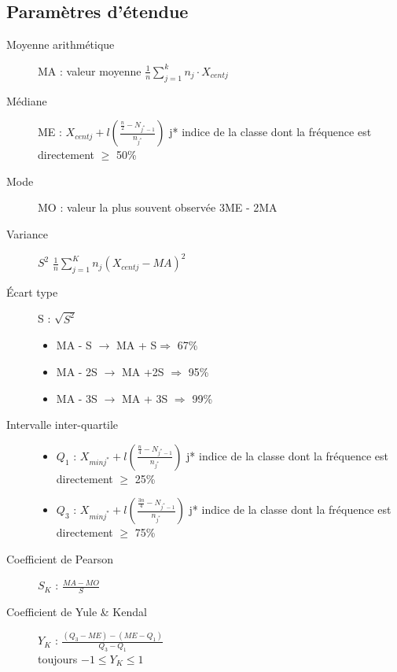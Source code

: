\documentclass[a4paper,12pt]{article}
\newcommand\tab[1][]{\hspace*{#1}}
\newcommand\Warning{%
 \makebox[1.4em][c]{%
 \makebox[0pt][c]{\raisebox{.1em}{\small!}}%
 \makebox[0pt][c]{\color{red}\Large$\bigtriangleup$}}}%
\begin{document}
\subsection{Paramètres d'étendue}
\begin{description}%
   \item[Moyenne arithmétique] MA : valeur moyenne $\frac{1}{n} \sum\limits_{j=1}^{k}{n_j \cdot X_{centj}}$
   \item[Médiane] ME : $X_{centj} + l(\frac{\frac{n}{2} - N_{j^*-1}}{n_{j^*}})$ \tab[1cm] j* indice de la classe dont la fréquence est directement $\geq$ 50\%
   \item[Mode] MO : valeur la plus souvent observée 3ME - 2MA
   \item[Variance] $S^2$ $\frac{1}{n}\sum\limits_{j=1}^{K}{n_j(X_{centj}-MA)^2}  $
   \item[Écart type] S : $\sqrt{S^2}$ 
    \begin{itemize}%
            \item MA - S $\rightarrow$ MA + S$\Rightarrow$ 67\%
            \item MA - 2S $\rightarrow$ MA +2S $\Rightarrow$ 95\%
            \item MA - 3S $\rightarrow$ MA + 3S $\Rightarrow$ 99\%
        \end{itemize}
   \item[Intervalle inter-quartile]
        \begin{itemize}%
            \item $Q_1$ : $X_{minj^*}+l(\frac{\frac{n}{4} -N_{j^*-1}}{n_{j^*}})$ \tab[1cm] j* indice de la classe dont la fréquence est directement $\geq$ 25\%
            \item  $Q_3$ : $X_{minj^*}+l(\frac{\frac{3n}{4} -N_{j^*-1}}{n_{j^*}})$ \tab[1cm] j* indice de la classe dont la fréquence est directement $\geq$ 75\%
        \end{itemize}
    \item[Coefficient de Pearson] $S_K$ : $\frac{MA - MO}{S}$
    \item[Coefficient de Yule \& Kendal] $Y_K$ : $\frac{(Q_3 - ME)-(ME-Q_1)}{Q_3-Q_1}$ \\
        \tab[2cm] \Warning toujours $-1\leq Y_K\leq 1 $
\end{description}
\end{document}
